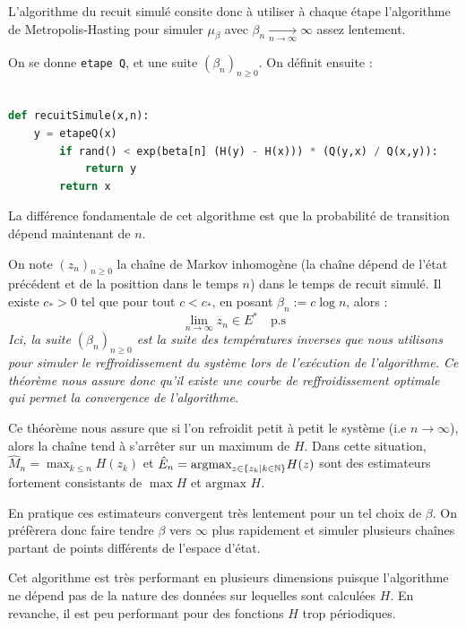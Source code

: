 L'algorithme du recuit simulé consite donc à utiliser à chaque étape 
l'algorithme de Metropolis-Hasting pour simuler $ \mu_\beta$ avec 
$ \beta_n \underset{n \to \infty}{\longrightarrow} \infty$ assez lentement. 

\begin{proposition}
    On se donne \texttt{etape Q}, et une suite $( \beta_n)_{n \geqslant 0}$. 
    On définit ensuite : 
    \begin{lstlisting}[language=Python]

def recuitSimule(x,n): 
    y = etapeQ(x)
        if rand() < exp(beta[n] (H(y) - H(x))) * (Q(y,x) / Q(x,y)): 
            return y 
        return x
    \end{lstlisting}
    La différence fondamentale de cet algorithme est que la probabilité de 
    transition dépend maintenant de $n$.
\end{proposition}

\begin{theorem}
    On note $(z_n)_{n \geqslant 0}$ la chaîne de Markov inhomogène (la chaîne dépend de l'état 
    précédent et de la posittion dans le temps $n$) dans 
    le temps de recuit simulé. Il existe $c_* > 0$ tel que pour tout $ c < c_*$,
    en posant $ \beta_n := c \log n$, alors : 
        \begin{equation}
            \boxed{ \lim_{n \to \infty} z_n \in E^*} \quad \text{p.s} 
        \end{equation}
    \emph{
        Ici, la suite $(\beta_n)_{n \geqslant 0}$ est la suite des températures inverses que nous utilisons pour simuler 
        le reffroidissement du système lors de l'exécution de l'algorithme.
        Ce théorème nous assure donc qu'il existe une courbe de reffroidissement optimale qui permet la 
        convergence de l'algorithme.
    }
\end{theorem}


\begin{remark}
    Ce théorème nous assure que si l'on refroidit petit à petit le système (i.e $ n \to \infty$), 
    alors la chaîne tend à s'arrêter sur un maximum de $H$.
    Dans cette situation, $ \hat{M}_n = \max_{k \leqslant n} H(z_k)$ et 
    $ \hat{E}_n = \text{argmax}_{z \in \{z_k \mid k \in \mathbb{N}\}} H(z)$ sont des estimateurs 
    fortement consistants de $\max H$ et $ \text{argmax } H$.

    \medskip 

    En pratique ces estimateurs convergent très lentement pour un tel choix de 
    $ \beta$. On préfèrera donc faire tendre $ \beta$ vers $ \infty$ plus rapidement 
    et simuler plusieurs chaînes partant de points différents de l'espace d'état.

    \medskip 

    Cet algorithme est très performant en plusieurs dimensions puisque l'algorithme 
    ne dépend pas de la nature des données sur lequelles sont calculées $H$.
    En revanche, il est peu performant pour des fonctions $H$ trop périodiques.
\end{remark}




